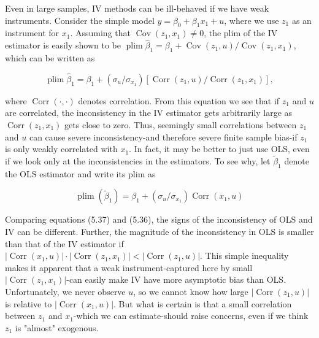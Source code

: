 \documentclass[10pt]{article}
\begin{document}
Even in large samples, IV methods can be ill-behaved if we have weak instruments. Consider the simple model $y=\beta_{0}+\beta_{1} x_{1}+u$, where we use $z_{1}$ as an instrument for $x_{1}$. Assuming that $\operatorname{Cov}\left(z_{1}, x_{1}\right) \neq 0$, the plim of the IV estimator is easily shown to be $\operatorname{plim} \hat{\beta}_{1}=\beta_{1}+\operatorname{Cov}\left(z_{1}, u\right) / \operatorname{Cov}\left(z_{1}, x_{1}\right)$,\\
which can be written as


\begin{equation*}
\operatorname{plim} \hat{\beta}_{1}=\beta_{1}+\left(\sigma_{u} / \sigma_{x_{1}}\right)\left[\operatorname{Corr}\left(z_{1}, u\right) / \operatorname{Corr}\left(z_{1}, x_{1}\right)\right], \tag{5.36}
\end{equation*}


where $\operatorname{Corr}(\cdot, \cdot)$ denotes correlation. From this equation we see that if $z_{1}$ and $u$ are correlated, the inconsistency in the IV estimator gets arbitrarily large as $\operatorname{Corr}\left(z_{1}, x_{1}\right)$ gets close to zero. Thus, seemingly small correlations between $z_{1}$ and $u$ can cause severe inconsistency-and therefore severe finite sample bias-if $z_{1}$ is only weakly correlated with $x_{1}$. In fact, it may be better to just use OLS, even if we look only at the inconsistencies in the estimators. To see why, let $\tilde{\beta}_{1}$ denote the OLS estimator and write its plim as


\begin{equation*}
\operatorname{plim}\left(\tilde{\beta}_{1}\right)=\beta_{1}+\left(\sigma_{u} / \sigma_{x_{1}}\right) \operatorname{Corr}\left(x_{1}, u\right) \tag{5.37}
\end{equation*}


Comparing equations (5.37) and (5.36), the signs of the inconsistency of OLS and IV can be different. Further, the magnitude of the inconsistency in OLS is smaller than that of the IV estimator if $\left|\operatorname{Corr}\left(x_{1}, u\right)\right| \cdot\left|\operatorname{Corr}\left(z_{1}, x_{1}\right)\right|<\left|\operatorname{Corr}\left(z_{1}, u\right)\right|$. This simple inequality makes it apparent that a weak instrument-captured here by small $\left|\operatorname{Corr}\left(z_{1}, x_{1}\right)\right|$-can easily make IV have more asymptotic bias than OLS. Unfortunately, we never observe $u$, so we cannot know how large $\left|\operatorname{Corr}\left(z_{1}, u\right)\right|$ is relative to $\left|\operatorname{Corr}\left(x_{1}, u\right)\right|$. But what is certain is that a small correlation between $z_{1}$ and $x_{1}$-which we can estimate-should raise concerns, even if we think $z_{1}$ is "almost" exogenous.
\end{document}
